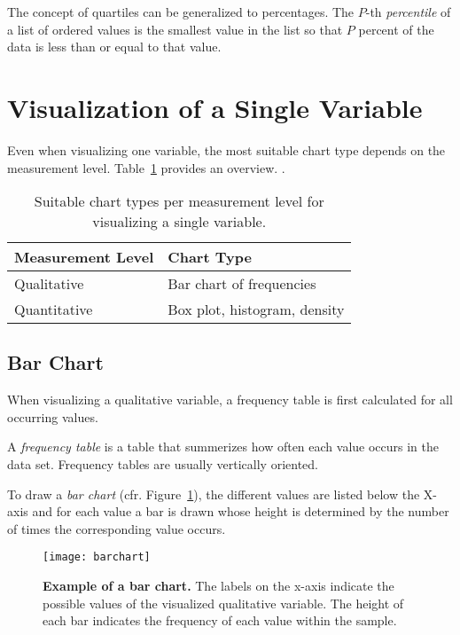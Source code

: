 The concept of quartiles can be generalized to percentages. The $P$-th \emph{percentile} of a list of ordered values is the smallest value in the list so that $P$ percent of the data is less than or equal to that value.


\section{Visualization of a Single Variable}

Even when visualizing one variable, the most suitable chart type depends on the measurement level.
Table~\ref{tab:charttypes-1-variable} provides an overview.
.

\begin{table}
    \centering
    \begin{tabular}{ll}
        \toprule
        \textbf{Measurement Level} & \textbf{Chart Type}   \\
        \midrule
        Qualitative         & Bar chart of frequencies     \\
        \midrule
        Quantitative        & Box plot, histogram, density \\
        \bottomrule
    \end{tabular}
    \caption{Suitable chart types per measurement level for visualizing a single variable.}
    \label{tab:charttypes-1-variable}
\end{table}

\subsection{Bar Chart}

When visualizing a qualitative variable, a frequency table is first calculated for all occurring values.

\begin{definition}
    A \emph{frequency table} is a table that summerizes how often each value occurs in the data set.
    Frequency tables are usually vertically oriented.
\end{definition}

To draw a \emph{bar chart} (cfr. Figure~\ref{fig:barchart}), the different values are listed below the X-axis and for each value a bar is drawn whose height is determined by the number of times the corresponding value occurs.

\begin{figure}
    \centering
    \texttt{[image: barchart]}
    \caption[Example of a bar chart]{\textbf{Example of a bar chart.} The labels on the x-axis indicate the possible values of the visualized qualitative variable. The height of each bar indicates the frequency of each value within the sample.}
    \label{fig:barchart}
\end{figure}

